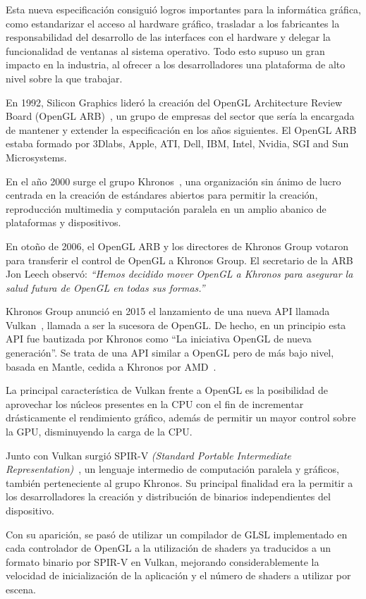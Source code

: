 Esta nueva especificación consiguió logros importantes para la informática gráfica,
como estandarizar el acceso al hardware gráfico, trasladar a los fabricantes la
responsabilidad del desarrollo de las interfaces con el hardware y delegar la
funcionalidad de ventanas al sistema operativo. Todo esto supuso un gran impacto
en la industria, al ofrecer a los desarrolladores una plataforma de alto nivel
sobre la que trabajar.

En 1992, Silicon Graphics lideró la creación del OpenGL Architecture Review
Board (OpenGL ARB)~\cite{OpenGLARB}, un grupo de empresas del sector que sería
la encargada de mantener y extender la especificación en los años siguientes. El
OpenGL ARB estaba formado por 3Dlabs, Apple, ATI, Dell, IBM, Intel, Nvidia, SGI
and Sun Microsystems.

En el año 2000 surge el grupo Khronos~\cite{Khronos}, una organización sin ánimo
de lucro centrada en la creación de estándares abiertos para permitir la
creación, reproducción multimedia y computación paralela en un amplio abanico de
plataformas y dispositivos.

En otoño de 2006, el OpenGL ARB y los directores de Khronos Group
votaron para transferir el control de OpenGL a Khronos Group. El secretario de
la ARB Jon Leech observó: \textit{``Hemos decidido mover OpenGL a Khronos para
		asegurar la salud futura de OpenGL en todas sus
formas.''}~\cite{OpenGLARB}

Khronos Group anunció en 2015 el lanzamiento de una nueva API llamada
Vulkan~\cite{Vulkan}, llamada a ser la sucesora de OpenGL. De hecho, en un
principio esta API fue bautizada por Khronos como ``La iniciativa OpenGL de
nueva generación''. Se trata de una API similar a OpenGL pero de más bajo nivel,
basada en Mantle, cedida a Khronos por AMD~\cite{AMD}.

La principal característica de Vulkan frente a OpenGL es la posibilidad de
aprovechar los núcleos presentes en la CPU con el fin de incrementar
drásticamente el rendimiento gráfico, además de permitir un mayor control sobre
la GPU, disminuyendo la carga de la CPU.

Junto con Vulkan surgió SPIR-V \textit{(Standard Portable Intermediate
Representation)}~\cite{SPIR}, un lenguaje intermedio de computación paralela y
gráficos, también perteneciente al grupo Khronos. Su principal finalidad era la
permitir a los desarrolladores la creación y distribución de binarios
independientes del dispositivo.

Con su aparición, se pasó de utilizar un compilador de GLSL implementado en cada
controlador de OpenGL a la utilización de shaders ya traducidos a un formato
binario por SPIR-V en Vulkan, mejorando considerablemente la velocidad de
inicialización de la aplicación y el número de shaders a utilizar por escena.

